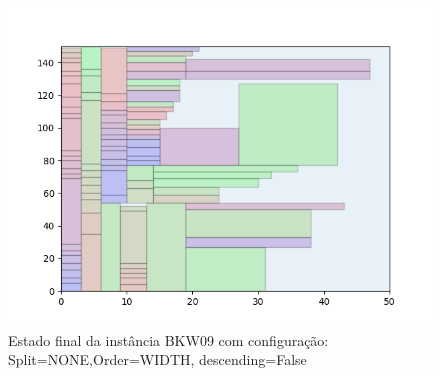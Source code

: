 \begin{figure}[H]
    \centering
    \caption[]{Estado final da instância BKW09 com configuração: Split=NONE,Order=WIDTH, descending=False}
    \label{fig:bkw09-none-width-false}
    \includegraphics[scale=0.5]{output/figures/bkw/bkw09/none/width/false/000}
\end{figure}